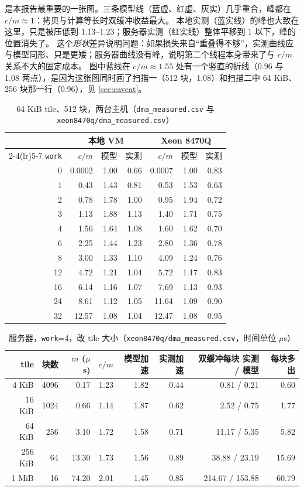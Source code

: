 \documentclass[11pt,a4paper]{ctexart}
\begin{document}
 是本报告最重要的一张图。三条模型线（蓝虚、红虚、灰实）几乎重合，峰都在 $c/m\approx1$：拷贝与计算等长时双缓冲收益最大。
本地实测（蓝实线）的峰也大致在这里，只是被压低到 1.13--1.23；服务器实测（红实线）整体平移到 1 以下，峰的位置消失了。
这个\emph{形状}差异说明问题：如果损失来自“重叠得不够”，实测曲线应与模型同形、只是更矮；服务器曲线没有峰，说明第二个线程本身带来了与 $c/m$ 关系不大的固定成本。
图中蓝线在 $c/m\approx1.55$ 处有一个竖直的折线（0.96 与 1.08 两点），是因为这张图同时画了扫描一（512 块，1.08）和扫描二中 64 KiB、256 块那一行（0.96），见 \cref{sec:caveat}。

\begin{table}[H]
\centering\small
\caption{64 KiB tile、512 块，两台主机（\texttt{dma\_measured.csv} 与 \texttt{xeon8470q/dma\_measured.csv}）}\label{tab:cross}
\begin{tabular}{rrrrrrr}
\toprule
 & \multicolumn{3}{c}{本地 VM} & \multicolumn{3}{c}{Xeon 8470Q} \\
\cmidrule(lr){2-4}\cmidrule(lr){5-7}
\texttt{work} & $c/m$ & 模型 & 实测 & $c/m$ & 模型 & 实测 \\
\midrule
0 & 0.0002 & 1.00 & 0.66 & 0.0007 & 1.00 & 0.83 \\
1 & 0.43 & 1.43 & 0.81 & 0.53 & 1.53 & 0.63 \\
2 & 0.78 & 1.78 & 1.00 & 0.95 & 1.94 & 0.72 \\
3 & 1.13 & 1.88 & 1.13 & 1.40 & 1.71 & 0.75 \\
4 & 1.56 & 1.64 & 1.08 & 1.60 & 1.62 & 0.70 \\
6 & 2.25 & 1.44 & 1.23 & 2.80 & 1.36 & 0.78 \\
8 & 3.00 & 1.33 & 1.10 & 4.09 & 1.24 & 0.76 \\
12 & 4.72 & 1.21 & 1.04 & 5.72 & 1.17 & 0.83 \\
16 & 6.14 & 1.16 & 1.07 & 7.69 & 1.13 & 0.93 \\
24 & 8.61 & 1.12 & 1.05 & 11.64 & 1.09 & 0.90 \\
32 & 12.57 & 1.08 & 1.04 & 12.47 & 1.08 & 0.95 \\
\bottomrule
\end{tabular}
\end{table}

\begin{table}[H]
\centering\small
\caption{服务器，\texttt{work}=4，改 tile 大小（\texttt{xeon8470q/dma\_measured.csv}，时间单位 $\mu$s）}\label{tab:srvtiles}
\begin{tabular}{rrrrrrrr}
\toprule
tile & 块数 & $m$ ($\mu$s) & $c/m$ & 模型加速 & 实测加速 & 双缓冲每块 实测 / 模型 & 每块多出 \\
\midrule
4 KiB & 4096 & 0.17 & 1.23 & 1.82 & 0.44 & 0.81 / 0.21 & 0.60 \\
16 KiB & 1024 & 0.66 & 1.14 & 1.87 & 0.62 & 2.52 / 0.75 & 1.77 \\
64 KiB & 256 & 3.10 & 1.72 & 1.58 & 0.71 & 11.17 / 5.35 & 5.82 \\
256 KiB & 64 & 13.30 & 1.73 & 1.56 & 0.89 & 38.88 / 23.19 & 15.69 \\
1 MiB & 16 & 74.20 & 2.01 & 1.45 & 0.85 & 214.67 / 153.88 & 60.79 \\
\bottomrule
\end{tabular}
\end{table}
\end{document}
